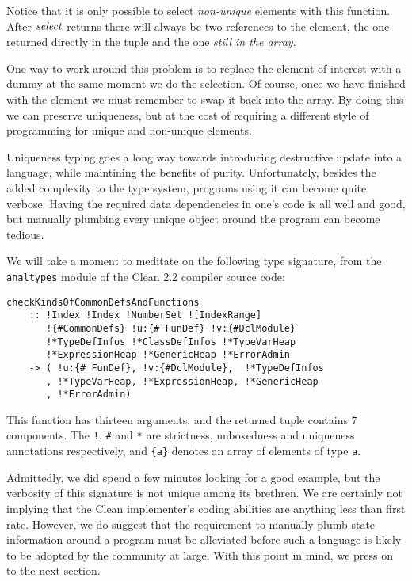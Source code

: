 Notice that it is only possible to select \emph{non-unique} elements with this function. After $\operatorname{\mathit{select}}$ returns there will always be two references to the element, the one returned directly in the tuple and the one \emph{still in the array}.

One way to work around this problem is to replace the element of interest with a dummy at the same moment we do the selection. Of course, once we have finished with the element we must remember to swap it back into the array. By doing this we can preserve uniqueness, but at the cost of requiring a different style of programming for unique and non-unique elements.

\code{
	$\ireplace 
		:: \iArray^\bullet \ a^\bullet 
		\lfun \iInt^\times 
		\lfuna{\bullet} \ a^\bullet \
		\lfuna{\bullet} (a^\bullet, \ \iArray^\bullet a^\bullet)^\bullet$
}

Uniqueness typing goes a long way towards introducing destructive update into a language, while maintining the benefits of purity. Unfortunately, besides the added complexity to the type system, programs using it can become quite verbose. Having the required data dependencies in one's code is all well and good, but manually plumbing every unique object around the program can become tedious. 

We will take a moment to meditate on the following type signature, from the \texttt{analtypes} module of the Clean 2.2 compiler source code:
\begin{lstlisting}
checkKindsOfCommonDefsAndFunctions 
    :: !Index !Index !NumberSet ![IndexRange] 
       !{#CommonDefs} !u:{# FunDef} !v:{#DclModule} 
       !*TypeDefInfos !*ClassDefInfos !*TypeVarHeap 
       !*ExpressionHeap !*GenericHeap !*ErrorAdmin 
    -> ( !u:{# FunDef}, !v:{#DclModule},  !*TypeDefInfos
       , !*TypeVarHeap, !*ExpressionHeap, !*GenericHeap
       , !*ErrorAdmin)
\end{lstlisting}

This function has thirteen arguments, and the returned tuple contains 7 components. The \texttt{!}, \texttt{\#} and \texttt{*} are strictness, unboxedness and uniqueness annotations respectively, and \texttt{\{a\}} denotes an array of elements of type \texttt{a}.

Admittedly, we did spend a few minutes looking for a good example, but the verbosity of this signature is not unique among its brethren. We are certainly not implying that the Clean implementer's coding abilities are anything less than first rate. However, we do suggest that the requirement to manually plumb state information around a program must be alleviated before such a language is likely to be adopted by the community at large. With this point in mind, we press on to the next section.
